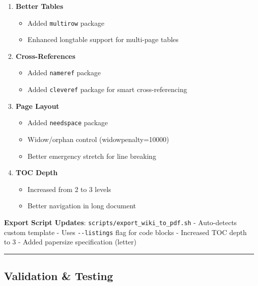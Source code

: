 \begin{enumerate}
\def\labelenumi{\arabic{enumi}.}
\setcounter{enumi}{1}
\tightlist
\item
  \textbf{Better Tables}

  \begin{itemize}
  \tightlist
  \item
    Added \texttt{multirow} package
  \item
    Enhanced longtable support for multi-page tables
  \end{itemize}
\item
  \textbf{Cross-References}

  \begin{itemize}
  \tightlist
  \item
    Added \texttt{nameref} package
  \item
    Added \texttt{cleveref} package for smart cross-referencing
  \end{itemize}
\item
  \textbf{Page Layout}

  \begin{itemize}
  \tightlist
  \item
    Added \texttt{needspace} package
  \item
    Widow/orphan control (widowpenalty=10000)
  \item
    Better emergency stretch for line breaking
  \end{itemize}
\item
  \textbf{TOC Depth}

  \begin{itemize}
  \tightlist
  \item
    Increased from 2 to 3 levels
  \item
    Better navigation in long document
  \end{itemize}
\end{enumerate}

\textbf{Export Script Updates}:
\texttt{scripts/export\_wiki\_to\_pdf.sh} - Auto-detects custom template
- Uses \texttt{-\/-listings} flag for code blocks - Increased TOC depth
to 3 - Added papersize specification (letter)

\begin{center}\rule{0.5\linewidth}{0.5pt}\end{center}

\subsection{Validation \& Testing}\label{validation-testing}

